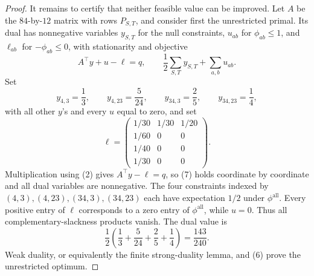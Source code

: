 \documentclass{article}
\begin{document}
\begin{proof}
It remains to certify that neither feasible value can be improved. Let \(A\) be the \(84\)-by-\(12\) matrix with rows \(P_{S,T}\), and consider first the unrestricted primal. Its dual has nonnegative variables \(y_{S,T}\) for the null constraints, \(u_{ab}\) for \(\phi_{ab}\leq1\), and \(\ell_{ab}\) for \(-\phi_{ab}\leq0\), with stationarity and objective
\[
 A^\top y+u-\ell=q,
 \qquad \frac12\sum_{S,T}y_{S,T}+\sum_{a,b}u_{ab}. \tag{7}
\]
Set
\[
 y_{4,3}=\frac13,\qquad y_{4,23}=\frac5{24},\qquad
 y_{34,3}=\frac25,\qquad y_{34,23}=\frac14, \tag{8}
\]
with all other \(y\)'s and every \(u\) equal to zero, and set
\[
 \ell=\begin{pmatrix}
 1/30&1/30&1/20\\
 1/60&0&0\\
 1/40&0&0\\
 1/30&0&0
 \end{pmatrix}. \tag{9}
\]
Multiplication using (2) gives \(A^\top y-\ell=q\), so (7) holds coordinate by coordinate and all dual variables are nonnegative. The four constraints indexed by \((4,3),(4,23),(34,3),(34,23)\) each have expectation \(1/2\) under \(\phi^{\mathrm{all}}\). Every positive entry of \(\ell\) corresponds to a zero entry of \(\phi^{\mathrm{all}}\), while \(u=0\). Thus all complementary-slackness products vanish. The dual value is
\[
 \frac12\left(\frac13+\frac5{24}+\frac25+\frac14\right)
 =\frac{143}{240}. \tag{10}
\]
Weak duality, or equivalently the finite strong-duality lemma, and (6) prove the unrestricted optimum.


\end{proof}
\end{document}
